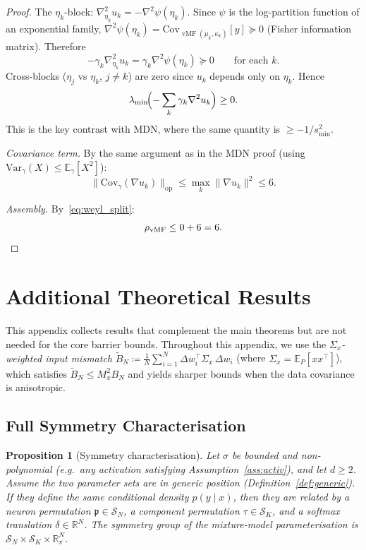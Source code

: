\documentclass[11pt]{article}
\newtheorem{proposition}[theorem]{Proposition}
\newcommand{\R}{\mathbb{R}}
\newcommand{\E}{\mathbb{E}}
\newcommand{\cS}{\mathcal{S}}
\DeclareMathOperator{\vmf}{vMF}
\newcommand{\nperm}{\mathfrak{p}}  %
\begin{document}
\begin{proof}
The $\eta_k$-block:
$\nabla^2_{\eta_k} u_k = -\nabla^2\psi(\eta_k)$.
Since $\psi$ is the log-partition function of an exponential family,
$\nabla^2\psi(\eta_k) = \mathrm{Cov}_{\vmf(\mu_k,\kappa_k)}[y]
\succeq 0$
(Fisher information matrix).
Therefore
\[
  -\gamma_k\nabla^2_{\eta_k} u_k
  = \gamma_k\nabla^2\psi(\eta_k) \succeq 0
  \qquad \text{for each } k.
\]
Cross-blocks ($\eta_j$ vs $\eta_k$, $j \ne k$) are zero since
$u_k$ depends only on $\eta_k$.
Hence
\begin{equation}\label{eq:vmf_weighted_hess}
  \lambda_{\min}\!\Bigl(-\sum_k\gamma_k\nabla^2 u_k\Bigr) \ge 0.
\end{equation}
This is the key contrast with MDN, where the same quantity is
$\ge -1/s_{\min}^2$.

\emph{Covariance term.}
By the same argument as in the MDN proof
(using $\mathrm{Var}_\gamma(X) \le \E_\gamma[X^2]$):
\[
  \|\mathrm{Cov}_\gamma(\nabla u_k)\|_{\mathrm{op}}
  \le \max_k \|\nabla u_k\|^2 \le 6.
\]

\emph{Assembly.}
By~\eqref{eq:weyl_split}:
\[
  \rho_{\vmf}
  \le 0 + 6 = 6. \qedhere
\]
\end{proof}

\section{Additional Theoretical Results}\label{app:additional}

This appendix collects results that complement the main theorems
but are not needed for the core barrier bounds.
Throughout this appendix, we use the
\emph{$\Sigma_x$-weighted input mismatch}
$\tilde B_N \coloneqq \frac{1}{N}\sum_{i=1}^N
\Delta w_i^\top \Sigma_x\,\Delta w_i$
(where $\Sigma_x = \E_P[xx^\top]$),
which satisfies $\tilde B_N \le M_x^2 B_N$
and yields sharper bounds when the data covariance is anisotropic.

\subsection{Full Symmetry Characterisation}\label{app:symmetry_full}

\begin{proposition}[Symmetry characterisation]\label{prop:symmetry}
Let $\sigma$ be bounded and non-polynomial (e.g.\ any activation
satisfying Assumption~\ref{ass:activ}), and let $d \ge 2$.
Assume the two parameter sets are in generic position
(Definition~\ref{def:generic}).
If they define the same
conditional density $p(y \mid x)$, then they are related by
a neuron permutation $\nperm \in \cS_N$, a component permutation
$\tau \in \cS_K$, and a softmax translation $\delta \in \R^N$.
The symmetry group of the mixture-model parameterisation is
$\cS_N \times \cS_K \times \R^N_\pi$.
\end{proposition}
\end{document}
